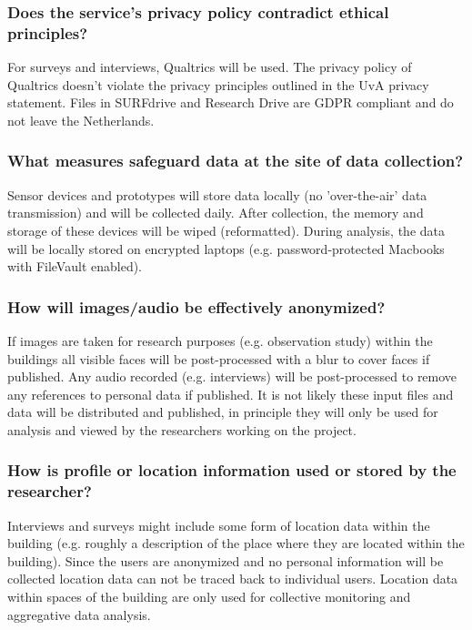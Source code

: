 \documentclass[a4paper]{article}
\begin{document}
\subsubsection{Does the service’s privacy policy contradict ethical principles?}

For surveys and interviews, Qualtrics will be used. The privacy policy of Qualtrics doesn't violate the privacy principles outlined in the UvA privacy statement. Files in SURFdrive and Research Drive are GDPR compliant and do not leave the Netherlands. 

\subsubsection{What measures safeguard data at the site of data collection?}

Sensor devices and prototypes will store data locally (no 'over-the-air' data transmission) and will be collected daily. After collection, the memory and storage of these devices will be wiped (reformatted). During analysis, the data will be locally stored on encrypted laptops (e.g. password-protected Macbooks with FileVault enabled). 

\subsubsection{How will images/audio be effectively anonymized?}

If images are taken for research purposes (e.g. observation study) within the buildings all visible faces will be post-processed with a blur to cover faces if published. Any audio recorded (e.g. interviews) will be post-processed to remove any references to personal data if published. It is not likely these input files and data will be distributed and published, in principle they will only be used for analysis and viewed by the researchers working on the project.

\subsubsection{How is profile or location information used or stored by the researcher?}

Interviews and surveys might include some form of location data within the building (e.g. roughly a description of the place where they are located within the building). Since the users are anonymized and no personal information will be collected location data can not be traced back to individual users. Location data within spaces of the building are only used for collective monitoring and aggregative data analysis.
\end{document}
